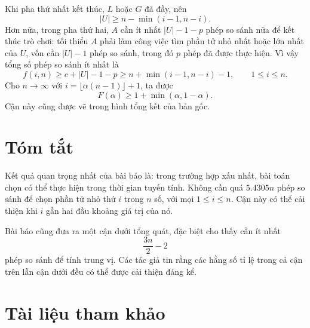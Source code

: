 \documentclass[11pt]{article}
\begin{document}
Khi pha thứ nhất kết thúc, \(L\) hoặc \(G\) đã đầy, nên
\[
  |U|\ge n-\min(i-1,n-i).
  \tag{22}
\]
Hơn nữa, trong pha thứ hai, \(A\) cần ít nhất \(|U|-1-p\) phép so sánh nữa để
kết thúc trò chơi: tối thiểu \(A\) phải làm công việc tìm phần tử nhỏ nhất
hoặc lớn nhất của \(U\), vốn cần \(|U|-1\) phép so sánh, trong đó \(p\) phép đã
được thực hiện. Vì vậy tổng số phép so sánh ít nhất là
\[
  f(i,n)\ge c+|U|-1-p
  \ge n+\min(i-1,n-i)-1,
  \qquad 1\le i\le n.
  \tag{23}
\]
Cho \(n\to\infty\) với \(i=\lfloor\alpha(n-1)\rfloor+1\), ta được
\[
  F(\alpha)\ge 1+\min(\alpha,1-\alpha).
  \tag{24}
\]
Cận này cũng được vẽ trong hình tổng kết của bản gốc.

\section{Tóm tắt}

Kết quả quan trọng nhất của bài báo là: trong trường hợp xấu nhất, bài toán
chọn có thể thực hiện trong thời gian tuyến tính. Không cần quá \(5.4305n\)
phép so sánh để chọn phần tử nhỏ thứ \(i\) trong \(n\) số, với mọi
\(1\le i\le n\). Cận này có thể cải thiện khi \(i\) gần hai đầu khoảng giá trị
của nó.

Bài báo cũng đưa ra một cận dưới tổng quát, đặc biệt cho thấy cần ít nhất
\[
  \frac{3n}{2}-2
\]
phép so sánh để tính trung vị. Các tác giả tin rằng các hằng số tỉ lệ trong cả
cận trên lẫn cận dưới đều có thể được cải thiện đáng kể.

\section*{Tài liệu tham khảo}
\end{document}

